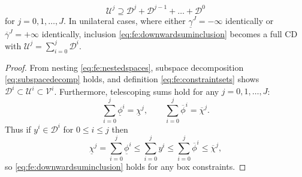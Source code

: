 \documentclass[review,hidelinks,onefignum,onetabnum]{siamart220329}
\newcommand{\cV}{\mathcal{V}}
\begin{document}
\begin{lemma}  \label{lem:downwardadmissibility}
\begin{equation}
\mathcal{U}^j \supseteq \mathcal{D}^j + \mathcal{D}^{j-1} + \dots + \mathcal{D}^0 \label{eq:fe:downwardsuminclusion}
\end{equation}
for $j=0,1,\dots,J$.  In unilateral cases, where either $\underline{\gamma}^J=-\infty$ identically or $\overline{\gamma}^J=+\infty$ identically, inclusion \eqref{eq:fe:downwardsuminclusion} becomes a full CD with $\mathcal{U}^j=\sum_{i=0}^j \mathcal{D}^i$.
\end{lemma}

\begin{proof}  From nesting \eqref{eq:fe:nestedspaces}, subspace decomposition \eqref{eq:subspacedecomp} holds, and definition \eqref{eq:fe:constraintsets} shows $\mathcal{D}^i \subset \mathcal{U}^i \subset \cV^i$.  Furthermore, telescoping sums hold for any $j=0,1,\dots,J$:
\begin{equation}
\sum_{i=0}^j \underline{\phi}^i = \underline{\chi}^j, \qquad \sum_{i=0}^j \overline{\phi}^i = \overline{\chi}^j.  \label{eq:fe:telescoping}
\end{equation}
Thus if $y^i \in \mathcal{D}^i$ for $0 \le i \le j$ then
\begin{equation}
\underline{\chi}^j = \sum_{i=0}^j \underline{\phi}^i \le \sum_{i=0}^j y^i \le \sum_{i=0}^j \overline{\phi}^i \le \overline{\chi}^j, \label{eq:fe:lemmaordering}
\end{equation}
so \eqref{eq:fe:downwardsuminclusion} holds for any box constraints.


\end{proof}
\end{document}
